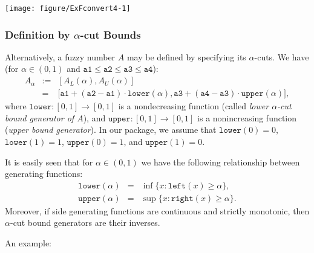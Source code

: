 \documentclass[11pt]{article}\usepackage[]{graphicx}\usepackage[]{color}
\newenvironment{knitrout}{}{} %
\begin{document}
\begin{center}
\begin{knitrout}\small
{}\color{fgcolor}

{\centering \texttt{[image: figure/ExFconvert4-1]} 

}



\end{knitrout}
\end{center}



\subsubsection{Definition by $\alpha$-cut Bounds}

Alternatively, a fuzzy number $A$ may be defined by specifying
its $\alpha$-cuts. We have (for $\alpha\in(0,1)$ and
$\mathtt{a1}\le\mathtt{a2}\le\mathtt{a3}\le\mathtt{a4}$):
\begin{eqnarray}
A_\alpha & := & [A_L(\alpha), A_U(\alpha)]\\
 & = & \big[
   \mathtt{a1}+(\mathtt{a2}-\mathtt{a1})\cdot\mathtt{lower}(\alpha),
   \mathtt{a3}+(\mathtt{a4}-\mathtt{a3})\cdot\mathtt{upper}(\alpha)
\big],
\end{eqnarray}
where $\mathtt{lower}: [0,1]\to[0,1]$ is a nondecreasing function
(called \textit{lower $\alpha$-cut bound generator of $A$}),
and $\mathtt{upper}: [0,1]\to[0,1]$ is a nonincreasing function
(\textit{upper bound generator}).
In our package, we assume that
$\mathtt{lower}(0)=0$, $\mathtt{lower}(1)=1$,
$\mathtt{upper}(0)=1$, and $\mathtt{upper}(1)=0$.

It is easily seen that for $\alpha\in(0,1)$ we have the following
relationship between generating functions:
\begin{eqnarray}
\mathtt{lower}(\alpha) & = & \inf\{x: \mathtt{left}(x)\ge\alpha\}, \\
\mathtt{upper}(\alpha) & = & \sup\{x: \mathtt{right}(x)\ge\alpha\}.
\end{eqnarray}
Moreover, if side generating functions are continuous and strictly
monotonic, then $\alpha$-cut bound generators are their inverses.

\bigskip\noindent
An example:
\end{document}
